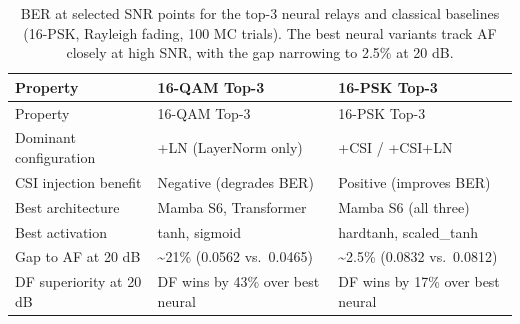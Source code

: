 \begin{longtable}[]{@{}
  >{\raggedright\arraybackslash}p{}
  >{\raggedright\arraybackslash}p{}
  >{\raggedright\arraybackslash}p{}@{}}
\caption{BER at selected SNR points for the top-3 neural relays and classical baselines (16-PSK, Rayleigh fading, 100 MC trials). The best neural variants track AF closely at high SNR, with the gap narrowing to 2.5\% at 20 dB.}\label{tbl:table20}\tabularnewline
\toprule\noalign{}
\begin{minipage}[b]{\linewidth}\raggedright
Property
\end{minipage} & \begin{minipage}[b]{\linewidth}\raggedright
16-QAM Top-3
\end{minipage} & \begin{minipage}[b]{\linewidth}\raggedright
16-PSK Top-3
\end{minipage} \\
\midrule\noalign{}
\endfirsthead
\toprule\noalign{}
\begin{minipage}[b]{\linewidth}\raggedright
Property
\end{minipage} & \begin{minipage}[b]{\linewidth}\raggedright
16-QAM Top-3
\end{minipage} & \begin{minipage}[b]{\linewidth}\raggedright
16-PSK Top-3
\end{minipage} \\
\midrule\noalign{}
\endhead
\bottomrule\noalign{}
\endlastfoot
Dominant configuration & +LN (LayerNorm only) & +CSI / +CSI+LN \\
CSI injection benefit & Negative (degrades BER) & Positive (improves BER) \\
Best architecture & Mamba S6, Transformer & Mamba S6 (all three) \\
Best activation & tanh, sigmoid & hardtanh, scaled\_tanh \\
Gap to AF at 20 dB & \textasciitilde21\% (0.0562 vs.~0.0465) & \textasciitilde2.5\% (0.0832 vs.~0.0812) \\
DF superiority at 20 dB & DF wins by 43\% over best neural & DF wins by 17\% over best neural \\
\end{longtable}


